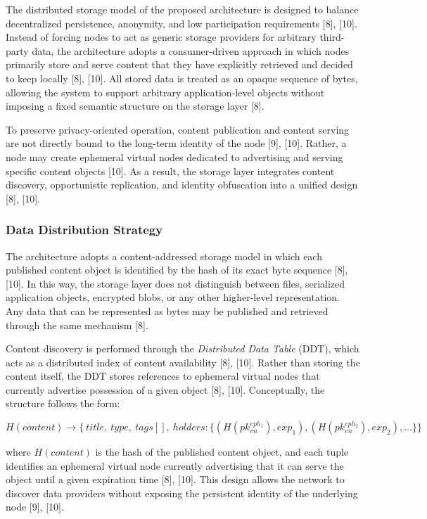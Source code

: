 \documentclass[12pt,a4paper]{article}
\begin{document}
The distributed storage model of the proposed architecture is designed to balance decentralized persistence, anonymity, and low participation requirements [8], [10]. Instead of forcing nodes to act as generic storage providers for arbitrary third-party data, the architecture adopts a consumer-driven approach in which nodes primarily store and serve content that they have explicitly retrieved and decided to keep locally [8], [10]. All stored data is treated as an opaque sequence of bytes, allowing the system to support arbitrary application-level objects without imposing a fixed semantic structure on the storage layer [8].

To preserve privacy-oriented operation, content publication and content serving are not directly bound to the long-term identity of the node [9], [10]. Rather, a node may create ephemeral virtual nodes dedicated to advertising and serving specific content objects [10]. As a result, the storage layer integrates content discovery, opportunistic replication, and identity obfuscation into a unified design [8], [10].

\subsubsection{Data Distribution Strategy}

The architecture adopts a content-addressed storage model in which each published content object is identified by the hash of its exact byte sequence [8], [10]. In this way, the storage layer does not distinguish between files, serialized application objects, encrypted blobs, or any other higher-level representation. Any data that can be represented as bytes may be published and retrieved through the same mechanism [8].

Content discovery is performed through the \textit{Distributed Data Table} (DDT), which acts as a distributed index of content availability [8], [10]. Rather than storing the content itself, the DDT stores references to ephemeral virtual nodes that currently advertise possession of a given object [8], [10]. Conceptually, the structure follows the form:

\[
H(content) \rightarrow \{ \ title, \ type, \ tags[], \  holders: \{
(H(pk_{vn}^{eph_1}), exp_1), (H(pk_{vn}^{eph_2}), exp_2), \dots \}\}
\]

where \(H(content)\) is the hash of the published content object, and each tuple identifies an ephemeral virtual node currently advertising that it can serve the object until a given expiration time [8], [10]. This design allows the network to discover data providers without exposing the persistent identity of the underlying node [9], [10].
\end{document}
